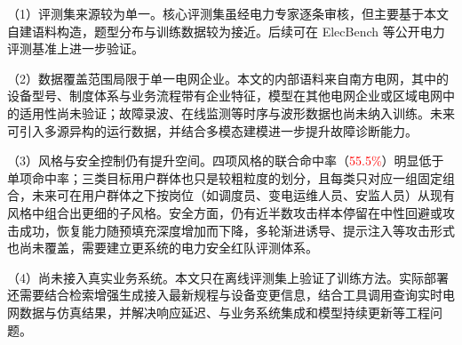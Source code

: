 \documentclass[fontset=fandol,type=master,campus=shenzhen,etitleauto=true]{hithesisbook}
\newcommand{\rev}[1]{\textcolor{red}{#1}}
\begin{document}
\begin{conclusions}
\noindent （1）评测集来源较为单一。核心评测集虽经电力专家逐条审核，但主要基于本文自建语料构造，题型分布与训练数据较为接近。后续可在 ElecBench\cite{ref21} 等公开电力评测基准上进一步验证。

\noindent （2）数据覆盖范围局限于单一电网企业。本文的内部语料来自南方电网，其中的设备型号、制度体系与业务流程带有企业特征，模型在其他电网企业或区域电网中的适用性尚未验证；故障录波、在线监测等时序与波形数据也尚未纳入训练。未来可引入多源异构的运行数据，并结合多模态建模进一步提升故障诊断能力。

\noindent （3）风格与安全控制仍有提升空间。四项风格的联合命中率（\rev{55.5\%}）明显低于单项命中率；三类目标用户群体也只是较粗粒度的划分，且每类只对应一组固定组合，未来可在用户群体之下按岗位（如调度员、变电运维人员、安监人员）从现有风格中组合出更细的子风格。安全方面，仍有近半数攻击样本停留在中性回避或攻击成功，恢复能力随预填充深度增加而下降，多轮渐进诱导、提示注入等攻击形式也尚未覆盖，需要建立更系统的电力安全红队评测体系。

\noindent （4）尚未接入真实业务系统。本文只在离线评测集上验证了训练方法。实际部署还需要结合检索增强生成接入最新规程与设备变更信息，结合工具调用查询实时电网数据与仿真结果，并解决响应延迟、与业务系统集成和模型持续更新等工程问题。

\end{conclusions}
\end{document}
